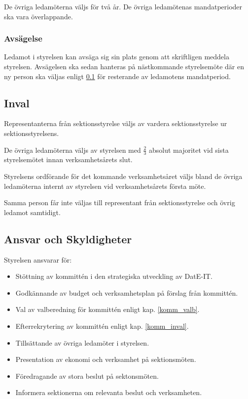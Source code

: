 \documentclass{article}
\begin{document}
De övriga ledamöterna väljs för två år. De övriga ledamötenas mandatperioder ska vara överlappande.

\subsubsection{Avsägelse}
Ledamot i styrelsen kan avsäga sig sin plats genom att skriftligen meddela styrelsen. Avsägelsen ska sedan hanteras på nästkommande styrelsemöte där en ny person ska väljas enligt \ref{styrelse-val} för resterande av ledamotens mandatperiod.

\subsection{Inval} \label{styrelse-val}
Representanterna från sektionsstyrelse väljs av vardera sektionsstyrelse ur sektionsstyrelsens.

De övriga ledamöterna väljs av styrelsen med $\frac{2}{3}$ absolut majoritet vid sista styrelsemötet innan verksamhetsårets slut.

Styrelsens ordförande för det kommande verksamhetsåret väljs bland de övriga ledamöterna internt av styrelsen vid verksamhetsårets första möte.

Samma person får inte väljas till representant från sektionsstyrelse och övrig ledamot samtidigt.

\subsection{Ansvar och Skyldigheter}
Styrelsen ansvarar för:
\begin{itemize}
    \item Stöttning av kommittén i den strategiska utveckling av DatE-IT.
    \item Godkännande av budget och verksamhetsplan på förslag från kommittén.
    \item Val av valberedning för kommittén enligt kap. \ref{komm_valb}.
    \item Efterrekrytering av kommittén enligt kap. \ref{komm_inval}.
    \item Tillsättande av övriga ledamöter i styrelsen.
    \item Presentation av ekonomi och verksamhet på sektionsmöten.
    \item Föredragande av stora beslut på sektonsmöten.
    \item Informera sektionerna om relevanta beslut och verksamheten.
\end{itemize}
\end{document}
